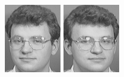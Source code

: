 \begin{figure}[ht]
 \includegraphics[width=\columnwidth/11]{ch3/figures/s6_7.png}
 \includegraphics[width=\columnwidth/11]{ch3/figures/s6_8.png}

\end{figure}
